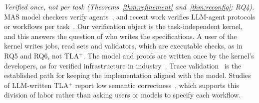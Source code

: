 \emph{Verified once, not per task (Theorems~\ref{thm:refinement} and~\ref{thm:reconfig}; RQ4).} MAS model checkers verify agents~\cite{lomuscio2017mcmas,dennis2012ajpf}, and recent work verifies LLM-agent protocols or workflows per task~\cite{xia2026tracefix,wang2026lean4agent}. Our verification object is the task-independent kernel, and this answers the question of who writes the specifications. A user of the kernel writes jobs, read sets and validators, which are executable checks, as in RQ5 and RQ6, not TLA$^+$. The model and proofs are written once by the kernel's developers, as for verified infrastructure in industry~\cite{newcombe2015aws,howard2025smartcasual}. Trace validation~\cite{cirstea2024trace} is the established path for keeping the implementation aligned with the model. Studies of LLM-written TLA$^+$ report low semantic correctness~\cite{bisharat2026tlallm}, which supports this division of labor rather than asking users or models to specify each workflow.
